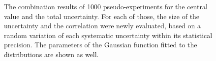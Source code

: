 \begin{figure}[tbp!]
\centering
{}
\caption[Stability determination for the $\sqrts=7$ and $8$~\TeV\ analyses]{
%
The combination results of 1000 pseudo-experiments for the central value and the total uncertainty. For each of those, the size of the uncertainty and the correlation were newly evaluated, based on a random variation of each systematic uncertainty within its statistical precision. The parameters of the Gaussian function fitted to the distributions are shown as well.
%
\label{fig:combstab}
}
\end{figure}


